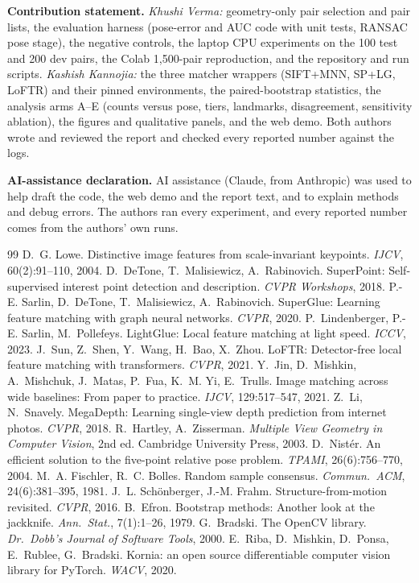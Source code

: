 \documentclass[10pt,twocolumn,letterpaper]{article}
\begin{document}
\noindent\textbf{Contribution statement.} \emph{Khushi Verma:} geometry-only pair selection and pair lists, the evaluation harness (pose-error and AUC code with unit tests, RANSAC pose stage), the negative controls, the laptop CPU experiments on the 100 test and 200 dev pairs, the Colab 1,500-pair reproduction, and the repository and run scripts. \emph{Kashish Kannojia:} the three matcher wrappers (SIFT+MNN, SP+LG, LoFTR) and their pinned environments, the paired-bootstrap statistics, the analysis arms A--E (counts versus pose, tiers, landmarks, disagreement, sensitivity ablation), the figures and qualitative panels, and the web demo. Both authors wrote and reviewed the report and checked every reported number against the logs.

\noindent\textbf{AI-assistance declaration.} AI assistance (Claude, from Anthropic) was used to help draft the code, the web demo and the report text, and to explain methods and debug errors. The authors ran every experiment, and every reported number comes from the authors' own runs.

{\footnotesize
\begin{thebibliography}{99}
\setlength{\itemsep}{0pt}
\setlength{\parsep}{0pt}
 D.~G. Lowe. Distinctive image features from scale-invariant keypoints. \emph{IJCV}, 60(2):91--110, 2004.
 D.~DeTone, T.~Malisiewicz, A.~Rabinovich. SuperPoint: Self-supervised interest point detection and description. \emph{CVPR Workshops}, 2018.
 P.-E. Sarlin, D.~DeTone, T.~Malisiewicz, A.~Rabinovich. SuperGlue: Learning feature matching with graph neural networks. \emph{CVPR}, 2020.
 P.~Lindenberger, P.-E. Sarlin, M.~Pollefeys. LightGlue: Local feature matching at light speed. \emph{ICCV}, 2023.
 J.~Sun, Z.~Shen, Y.~Wang, H.~Bao, X.~Zhou. LoFTR: Detector-free local feature matching with transformers. \emph{CVPR}, 2021.
 Y.~Jin, D.~Mishkin, A.~Mishchuk, J.~Matas, P.~Fua, K.~M. Yi, E.~Trulls. Image matching across wide baselines: From paper to practice. \emph{IJCV}, 129:517--547, 2021.
 Z.~Li, N.~Snavely. MegaDepth: Learning single-view depth prediction from internet photos. \emph{CVPR}, 2018.
 R.~Hartley, A.~Zisserman. \emph{Multiple View Geometry in Computer Vision}, 2nd ed. Cambridge University Press, 2003.
 D.~Nist\'er. An efficient solution to the five-point relative pose problem. \emph{TPAMI}, 26(6):756--770, 2004.
 M.~A. Fischler, R.~C. Bolles. Random sample consensus. \emph{Commun.\ ACM}, 24(6):381--395, 1981.
 J.~L. Sch\"onberger, J.-M. Frahm. Structure-from-motion revisited. \emph{CVPR}, 2016.
 B.~Efron. Bootstrap methods: Another look at the jackknife. \emph{Ann.\ Stat.}, 7(1):1--26, 1979.
 G.~Bradski. The OpenCV library. \emph{Dr.\ Dobb's Journal of Software Tools}, 2000.
 E.~Riba, D.~Mishkin, D.~Ponsa, E.~Rublee, G.~Bradski. Kornia: an open source differentiable computer vision library for PyTorch. \emph{WACV}, 2020.
\end{thebibliography}}
\end{document}
